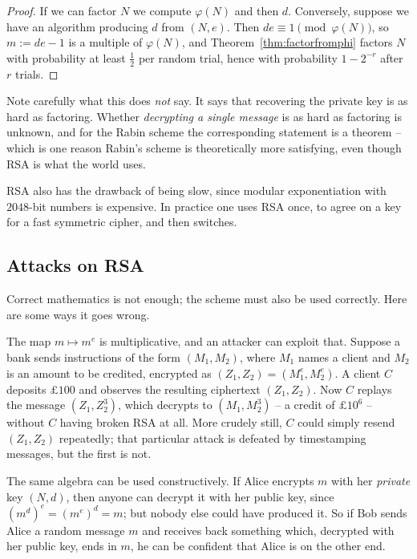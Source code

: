 \documentclass[a4paper]{scrartcl}
\begin{document}
\begin{proof}
	If we can factor $N$ we compute $\varphi(N)$ and then $d$. Conversely, suppose we have an algorithm producing $d$ from $(N,e)$. Then $de\equiv1\pmod{\varphi(N)}$, so $m := de-1$ is a multiple of $\varphi(N)$, and Theorem~\ref{thm:factorfromphi} factors $N$ with probability at least $\tfrac12$ per random trial, hence with probability $1-2^{-r}$ after $r$ trials.
\end{proof}

\begin{remark}
	Note carefully what this does \emph{not} say. It says that recovering the private key is as hard as factoring. Whether \emph{decrypting a single message} is as hard as factoring is unknown, and for the Rabin scheme the corresponding statement is a theorem -- which is one reason Rabin's scheme is theoretically more satisfying, even though RSA is what the world uses.

	RSA also has the drawback of being slow, since modular exponentiation with $2048$-bit numbers is expensive. In practice one uses RSA once, to agree on a key for a fast symmetric cipher, and then switches.
\end{remark}

\subsection{Attacks on RSA}

Correct mathematics is not enough; the scheme must also be used correctly. Here are some ways it goes wrong.

\begin{example}
	The map $m \mapsto m^e$ is multiplicative, and an attacker can exploit that. Suppose a bank sends instructions of the form $(M_1,M_2)$, where $M_1$ names a client and $M_2$ is an amount to be credited, encrypted as $(Z_1,Z_2) = (M_1^e,M_2^e)$. A client $C$ deposits $\pounds100$ and observes the resulting ciphertext $(Z_1,Z_2)$. Now $C$ replays the message $(Z_1,Z_2^3)$, which decrypts to $(M_1, M_2^3)$ -- a credit of $\pounds10^6$ -- without $C$ having broken RSA at all. More crudely still, $C$ could simply resend $(Z_1,Z_2)$ repeatedly; that particular attack is defeated by timestamping messages, but the first is not.
\end{example}

\begin{example}
	The same algebra can be used constructively. If Alice encrypts $m$ with her \emph{private} key $(N,d)$, then anyone can decrypt it with her public key, since $(m^d)^e = (m^e)^d = m$; but nobody else could have produced it. So if Bob sends Alice a random message $m$ and receives back something which, decrypted with her public key, ends in $m$, he can be confident that Alice is on the other end.
\end{example}
\end{document}
